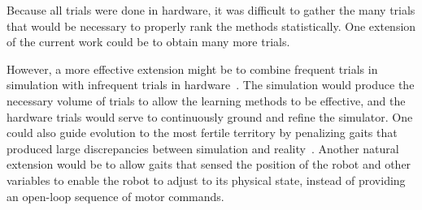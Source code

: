 
Because all trials were done in hardware, it was difficult to gather
the many trials that would be necessary to properly rank the methods statistically.
One extension of the current work could be to obtain many more trials.

However, a more effective extension might be to combine frequent trials in
simulation with infrequent trials in hardware~\cite{bongard}.  The simulation would produce the
necessary volume of trials to allow the learning methods to be
effective, and the hardware trials would serve to continuously ground
and refine the simulator.  One could also guide evolution to the most
fertile territory by penalizing gaits that produced large
discrepancies between simulation and reality~\cite{koos2010crossing}. Another natural extension would be to allow gaits that sensed the position of the robot and other variables to enable the robot to adjust to its physical state, instead of providing an open-loop sequence of motor commands. 

